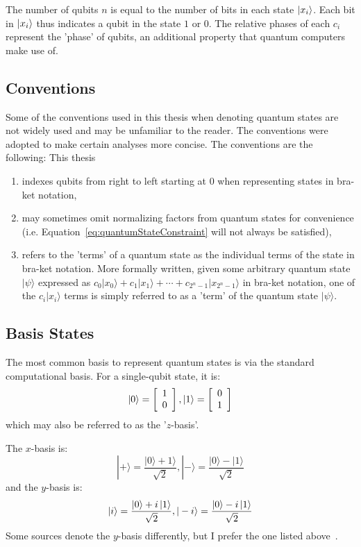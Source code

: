 The number of qubits $n$ is equal to the number of bits in each state $\ket{x_i}$. Each bit in $\ket{x_i}$ thus indicates a qubit in the state $1$ or $0$. The relative phases of each $c_i$ represent the 'phase' of qubits, an additional property that quantum computers make use of.

\subsection{Conventions}
Some of the conventions used in this thesis when denoting quantum states are not widely used and may be unfamiliar to the reader. The conventions were adopted to make certain analyses more concise. The conventions are the following: This thesis
\begin{enumerate}
    \item indexes qubits from right to left starting at 0 when representing states in bra-ket notation,
    \item may sometimes omit normalizing factors from quantum states for convenience (i.e. Equation~\eqref{eq:quantumStateConstraint} will not always be satisfied),
    \item refers to the 'terms' of a quantum state as the individual terms of the state in bra-ket notation. More formally written, given some arbitrary quantum state $|\psi\rangle$ expressed as $c_0|x_0\rangle + c_1|x_1\rangle + \cdots + c_{2^n - 1}|x_{2^n - 1}\rangle$ in bra-ket notation, one of the $c_i|x_i\rangle$ terms is simply referred to as a 'term' of the quantum state $|\psi\rangle$.
\end{enumerate}

\subsection{Basis States}
\label{subsection:basisStates}
The most common basis to represent quantum states is via the standard computational basis. For a single-qubit state, it is:
$$\ket{0} = \left[\begin{array}{c}
1 \\
0
\end{array}\right], \ket{1} = \left[\begin{array}{c}
0 \\
1
\end{array}\right]$$
which may also be referred to as the '$z$-basis'.

The $x$-basis is:
$$|+\rangle=\frac{|0\rangle+1\rangle}{\sqrt{2}},|-\rangle=\frac{|0\rangle-|1\rangle}{\sqrt{2}}$$
and the $y$-basis is:
$$|i\rangle=\frac{|0\rangle+i\ket{1}}{\sqrt{2}},|-i\rangle=\frac{|0\rangle-i\ket{1}}{\sqrt{2}}$$
Some sources denote the $y$-basis differently, but I prefer the one listed above~\cite{basisStates}.

